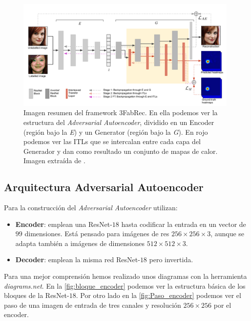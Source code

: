        \begin{figure}[H]
            \centering
            \includegraphics[width=0.98\textwidth]{img/3fabrec_arquitectura.png}
            \caption{Imagen resumen del framework 3FabRec. En ella podemos ver la estructura del \textit{Adversarial Autoencoder}, dividido en un Encoder (región bajo la \textit{E}) y un Generator (región bajo la \textit{G}). En rojo podemos ver las ITLs que se intercalan entre cada capa del Generador y dan como resultado un conjunto de mapas de calor. Imagen extraída de \cite{browatzki20203fabrec}.}
            \label{fig:3FabRec Resumen}
        \end{figure}

        \subsection{Arquitectura Adversarial Autoencoder}
            \noindent Para la construcción del \textit{Adversarial Autoencoder} utilizan:
            
            \begin{itemize}
                \item \textbf{Encoder}: emplean una ResNet-$18$  hasta codificar la entrada en un vector de $99$ dimensiones. Está pensado para imágenes de res $256 \times 256 \times 3$, aunque se adapta también a imágenes de dimensiones $512 \times 512 \times 3$.
                \item \textbf{Decoder}: emplean la misma red ResNet-$18$ pero invertida.
            \end{itemize}

            \noindent Para una mejor comprensión hemos realizado unos diagramas con la herramienta \textit{diagrams.net}. En la \autoref{fig:bloque_encoder} podemos ver la estructura básica de los bloques de la ResNet-$18$. Por otro lado en la \autoref{fig:Paso_encoder} podemos ver el paso de una imagen de entrada de tres canales y resolución $256 \times 256$ por el encoder.

